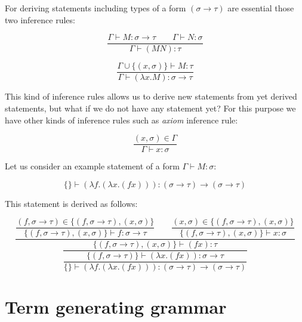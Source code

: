 \documentclass[12pt,a4paper]{report}
\newcommand{\Lets}{Let us }
\newcommand{\turst}[3]{$#1 \vdash #2 : #3$\xspace}
\newcommand{\GMS}{\turst{\Gamma}{M}{\sigma}}
\begin{document}
	For deriving statements including types of a form 
	$(\sigma \rightarrow \tau)$ are essential those two 
	inference rules:
	
	\begin{equation*}
		\frac{\Gamma \vdash M : \sigma \rightarrow \tau \qquad
			  \Gamma \vdash N : \sigma }
		     {\Gamma \vdash (M N) : \tau }
	\end{equation*}	
	
	\begin{equation*}
		\frac{\Gamma \cup \{ ( x,\sigma ) \} \vdash M : \tau }
		     {\Gamma \vdash (\lambda x . M) : \sigma \rightarrow \tau }
	\end{equation*}		 
	 
	This kind of inference rules allows us to derive new statements from yet derived statements, but 
	what if we do not have any statement yet? 
	For this purpose we have other kinds of inference rules such as {\it axiom} inference rule:   
	
	\begin{equation*}
		\frac{( x , \sigma )  \in \Gamma}
		     {\Gamma \vdash x : \sigma}
	\end{equation*}	
	
	\Lets consider an example statement of a form \GMS :
	
	\[
		\{\} \vdash (\lambda f . (\lambda x . (f x) )) : 
		(\sigma \rightarrow \tau) \rightarrow ( \sigma \rightarrow \tau ) 
	\]
		
	This statement is derived as follows: 
	
	\begin{equation*}
	\dfrac{
		\dfrac{ (f,\sigma \rightarrow \tau) \in \{ (f,\sigma \rightarrow \tau) , (x,\sigma)  \}  }
		     { \{ (f,\sigma \rightarrow \tau) , (x,\sigma)  \} \vdash f : \sigma \rightarrow \tau }
		\qquad
		\dfrac{ (x,\sigma) \in \{ (f,\sigma \rightarrow \tau) , (x,\sigma)  \}  }
		     { \{ (f,\sigma \rightarrow \tau) , (x,\sigma)  \} \vdash x : \sigma }
		 }
		 {
			\dfrac{		 	
		 		\{ (f,\sigma \rightarrow \tau) , (x,\sigma)  \} \vdash (f x) : \tau
		 	}{
				\dfrac{\{ (f,\sigma \rightarrow \tau) \} \vdash (\lambda x . (f x) ) : 
				\sigma \rightarrow \tau}
				{ \{ \} \vdash (\lambda f . (\lambda x . (f x) ) ) 
				  : (\sigma \rightarrow \tau) \rightarrow (\sigma \rightarrow \tau) }
		 	}
		 }
	\end{equation*}		
	
\section{Term generating grammar}
\end{document}
